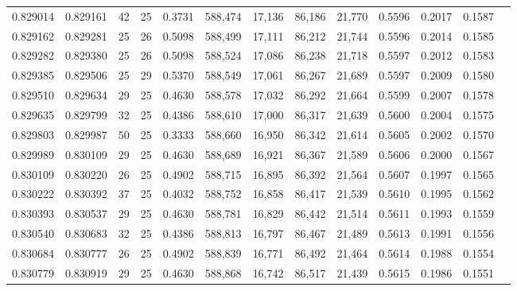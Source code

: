 \begin{tabular}{rrrrrrrrrrrrr}
0.829014 & 0.829161 &    42 &  25 &                                     0.3731 & 588,474 &  17,136 &  86,186 &  21,770 & 0.5596 & 0.2017 & 0.1587 \\
0.829162 & 0.829281 &    25 &  26 &                                     0.5098 & 588,499 &  17,111 &  86,212 &  21,744 & 0.5596 & 0.2014 & 0.1585 \\
0.829282 & 0.829380 &    25 &  26 &                                     0.5098 & 588,524 &  17,086 &  86,238 &  21,718 & 0.5597 & 0.2012 & 0.1583 \\
0.829385 & 0.829506 &    25 &  29 &                                     0.5370 & 588,549 &  17,061 &  86,267 &  21,689 & 0.5597 & 0.2009 & 0.1580 \\
0.829510 & 0.829634 &    29 &  25 &                                     0.4630 & 588,578 &  17,032 &  86,292 &  21,664 & 0.5599 & 0.2007 & 0.1578 \\
0.829635 & 0.829799 &    32 &  25 &                                     0.4386 & 588,610 &  17,000 &  86,317 &  21,639 & 0.5600 & 0.2004 & 0.1575 \\
0.829803 & 0.829987 &    50 &  25 &                                     0.3333 & 588,660 &  16,950 &  86,342 &  21,614 & 0.5605 & 0.2002 & 0.1570 \\
0.829989 & 0.830109 &    29 &  25 &                                     0.4630 & 588,689 &  16,921 &  86,367 &  21,589 & 0.5606 & 0.2000 & 0.1567 \\
0.830109 & 0.830220 &    26 &  25 &                                     0.4902 & 588,715 &  16,895 &  86,392 &  21,564 & 0.5607 & 0.1997 & 0.1565 \\
0.830222 & 0.830392 &    37 &  25 &                                     0.4032 & 588,752 &  16,858 &  86,417 &  21,539 & 0.5610 & 0.1995 & 0.1562 \\
0.830393 & 0.830537 &    29 &  25 &                                     0.4630 & 588,781 &  16,829 &  86,442 &  21,514 & 0.5611 & 0.1993 & 0.1559 \\
0.830540 & 0.830683 &    32 &  25 &                                     0.4386 & 588,813 &  16,797 &  86,467 &  21,489 & 0.5613 & 0.1991 & 0.1556 \\
0.830684 & 0.830777 &    26 &  25 &                                     0.4902 & 588,839 &  16,771 &  86,492 &  21,464 & 0.5614 & 0.1988 & 0.1554 \\
0.830779 & 0.830919 &    29 &  25 &                                     0.4630 & 588,868 &  16,742 &  86,517 &  21,439 & 0.5615 & 0.1986 & 0.1551 \\

\end{tabular}
